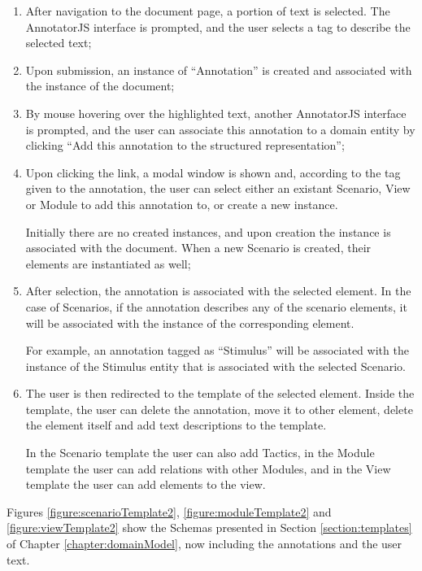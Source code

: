 \begin{enumerate}
\item After navigation to the document page, a portion of text is selected. The AnnotatorJS interface is prompted, and the user selects a tag to describe the selected text;

\item Upon submission, an instance of ``Annotation'' is created and associated with the instance of the document;

\item By mouse hovering over the highlighted text, another AnnotatorJS interface is prompted, and the user can associate this annotation to a domain entity by clicking ``Add this annotation to the structured representation'';

\item Upon clicking the link, a modal window is shown and, according to the tag given to the annotation, the user can select either an existant Scenario, View or Module to add this annotation to, or create a new instance. 

Initially there are no created instances, and upon creation the instance is associated with the document. When a new Scenario is created, their elements are instantiated as well;

\item After selection, the annotation is associated with the selected element. In the case of Scenarios, if the annotation describes any of the scenario elements, it will be associated with the instance of the corresponding element. 

For example, an annotation tagged as ``Stimulus'' will be associated with the instance of the Stimulus entity that is associated with the selected Scenario.

\item The user is then redirected to the template of the selected element. Inside the template, the user can delete the annotation, move it to other element, delete the element itself and add text descriptions to the template. 

In the Scenario template the user can also add Tactics, in the Module template the user can add relations with other Modules, and in the View template the user can add elements to the view.
\end{enumerate}

Figures \ref{figure:scenarioTemplate2}, \ref{figure:moduleTemplate2} and \ref{figure:viewTemplate2} show the Schemas presented in Section \ref{section:templates} of Chapter \ref{chapter:domainModel}, now including the annotations and the user text.

